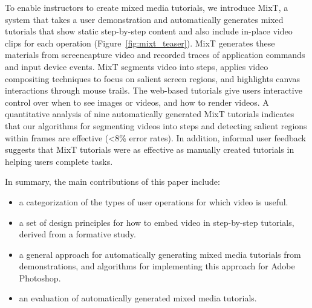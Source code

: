 To enable instructors to create mixed media tutorials, we introduce MixT, a system that takes a user demonstration and automatically generates mixed tutorials that show static step-by-step content and also include in-place video clips for each operation (Figure~\ref{fig:mixt_teaser}). MixT generates these materials from screencapture video and recorded traces of application commands and input device events. MixT segments video into steps, applies video compositing techniques to focus on salient screen regions, and highlights canvas interactions through mouse trails. The web-based tutorials give users interactive control over when to see images or videos, and how to render videos. A quantitative analysis of nine automatically generated MixT tutorials indicates that our algorithms for segmenting videos into steps and detecting salient regions within frames are effective ({\textless}8\% error rates). In addition, informal user feedback suggests that MixT tutorials were as effective as manually created tutorials in helping users complete tasks.

In summary, the main contributions of this paper include:

\begin{itemize}
  \itemsep -2pt
  \item a categorization of the types of user operations for which video is useful.
  \item a set of design principles for how to embed video in step-by-step tutorials, derived from a formative study.
  \item a general approach for automatically generating mixed media tutorials from demonstrations, and algorithms for implementing this approach for Adobe Photoshop.
  \item an evaluation of automatically generated mixed media tutorials.
\end{itemize}
